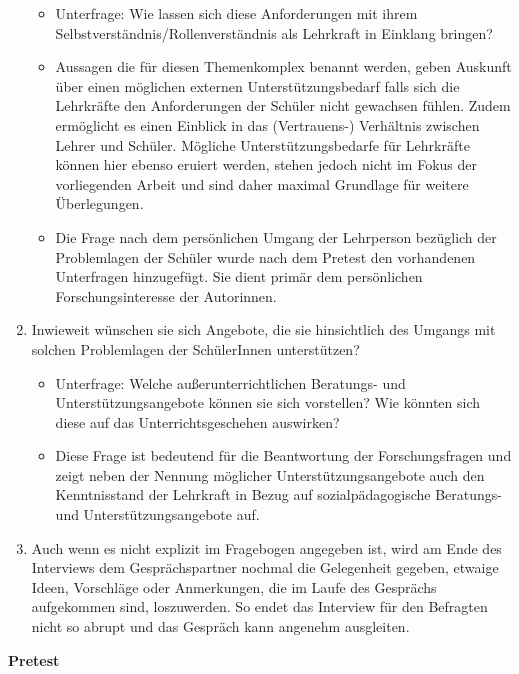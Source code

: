 \begin{enumerate}
	\begin{itemize}
		\item Unterfrage: Wie lassen sich diese Anforderungen mit ihrem Selbstverständnis/Rollenverständnis als Lehrkraft in Einklang bringen?
		\item Aussagen die für diesen Themenkomplex benannt werden, geben Auskunft über einen möglichen externen Unterstützungsbedarf falls sich die Lehrkräfte den Anforderungen der Schüler nicht gewachsen fühlen. Zudem ermöglicht es einen Einblick in das (Vertrauens-) Verhältnis zwischen Lehrer und Schüler. Mögliche Unterstützungsbedarfe für Lehrkräfte können hier ebenso eruiert werden, stehen jedoch nicht im Fokus der vorliegenden Arbeit und sind daher maximal Grundlage für weitere Überlegungen.
		\item Die Frage nach dem persönlichen Umgang der Lehrperson bezüglich der Problemlagen der Schüler wurde nach dem Pretest den vorhandenen Unterfragen hinzugefügt. Sie dient primär dem persönlichen Forschungsinteresse der Autorinnen.
	\end{itemize}
	\item Inwieweit wünschen sie sich Angebote, die sie hinsichtlich des Umgangs mit solchen Problemlagen der SchülerInnen unterstützen?
	\begin{itemize}
		\item Unterfrage: Welche außerunterrichtlichen Beratungs- und Unterstützungsangebote können sie sich vorstellen? Wie könnten sich diese auf das Unterrichtsgeschehen auswirken?
		\item Diese Frage ist bedeutend für die Beantwortung der Forschungsfragen und zeigt neben der Nennung möglicher Unterstützungsangebote auch den Kenntnisstand der Lehrkraft in Bezug auf sozialpädagogische Beratungs- und Unterstützungsangebote auf.
		\end{itemize}
	\item Auch wenn es nicht explizit im Fragebogen angegeben ist, wird am Ende des Interviews dem Gesprächspartner nochmal die Gelegenheit gegeben, etwaige Ideen, Vorschläge oder Anmerkungen, die im Laufe des Gesprächs aufgekommen sind, loszuwerden. So endet das Interview für den Befragten nicht so abrupt und das Gespräch kann angenehm ausgleiten.
\end{enumerate}

\noindent
\textbf{Pretest}\\

